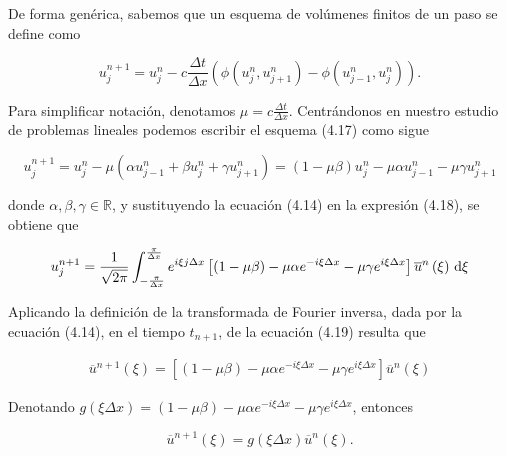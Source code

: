 De forma genérica, sabemos que un esquema de volúmenes finitos de un
paso se define como

\begin{equation*}
  u^{n+1}_{j}=
  u^{n}_{j}-
  c\frac{\Delta t}{\Delta x}
  \left(
  \phi\left(u^{n}_{j},u^{n}_{j+1}\right)-
  \phi\left(u^{n}_{j-1},u^{n}_{j}\right)
  \right).
\end{equation*}

Para simplificar notación, denotamos
\begin{math}
  \mu=
  c\frac{\Delta t}{\Delta x}
\end{math}.
Centrándonos en nuestro estudio de problemas lineales podemos
escribir el esquema (4.17) como sigue

\begin{equation*}
  u^{n+1}_{j}=
  u^{n}_{j}-
  \mu
  \left(
  \alpha u^{n}_{j-1}+
  \beta u^{n}_{j}+
  \gamma u^{n}_{j+1}
  \right)=
  \left(1-\mu\beta\right)
  u_j^n-
  \mu\alpha
  u^{n}_{j-1}-
  \mu\gamma
  u^{n}_{j+1}
\end{equation*}

donde $\alpha,\beta,\gamma\in\mathbb{R}$, y sustituyendo la ecuación
(4.14) en la expresión (4.18), se obtiene que

\begin{equation*}
  u^{n+1}_{j}=
  \frac{1}{\sqrt{2\pi}}
  \int_{-\frac{\pi}{\Delta x}}^{\frac{\pi}{\Delta x}}
  e^{i\xi j\Delta x}
  \left[
    \left(1-\mu\beta\right)-
    \mu\alpha
    e^{-i\xi\Delta x}-
    \mu\gamma
    e^{i\xi\Delta x}
    \right]
  \overline{u}^{n}\left(\xi\right)
  \dl\xi
\end{equation*}

Aplicando la definición de la transformada de Fourier inversa, dada
por la ecuación (4.14), en el tiempo $t_{n+1}$, de la ecuación (4.19)
resulta que

\begin{align*}
  \overline{u}^{n+1}
  \left(\xi\right)=
  \left[
    \left(1-\mu\beta\right)-
    \mu\alpha
    e^{-i\xi\Delta x}-
    \mu\gamma e^{i\xi\Delta x}
    \right]
  \overline{u}^{n}
  \left(\xi\right)
\end{align*}

Denotando
\begin{math}
  g
  \left(\xi\Delta x\right)=
  \left(1-\mu\beta\right)-
  \mu\alpha
  e^{-i\xi\Delta x}-
  \mu\gamma
  e^{i\xi\Delta x}
\end{math},
entonces

\begin{equation*}
  \overline{u}^{n+1}
  \left(\xi\right)=
  g
  \left(\xi\Delta x\right)
  \overline{u}^{n}
  \left(\xi\right).
\end{equation*}

